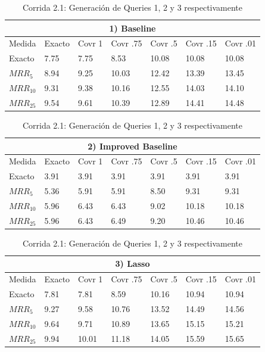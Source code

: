 \begin{table}
\centering
\begin{center}
\begin{tabular}{|l | l | l | l | l | l | l |}
\hline
\multicolumn{7}{|c|}{1) Baseline}  \\ \hline
Medida & Exacto & Covr 1 & Covr .75 & Covr .5 & Covr .15 & Covr .01 \\ \hline

Exacto & 7.75 & 7.75 & 8.53 & 10.08 & 10.08 & 10.08  \\ \hline
$MRR_{5}$ & 8.94 & 9.25 & 10.03 & 12.42 & 13.39 & 13.45  \\ \hline
$MRR_{10}$ & 9.31 & 9.38 & 10.16 & 12.55 & 14.03 & 14.10  \\ \hline
$MRR_{25}$ & 9.54 & 9.61 & 10.39 & 12.89 & 14.41 & 14.48  \\ \hline
\end{tabular}

\medskip

\begin{tabular}{|l | l | l | l | l | l | l |}
\hline
\multicolumn{7}{|c|}{2) Improved Baseline}  \\ \hline
Medida & Exacto & Covr 1 & Covr .75 & Covr .5 & Covr .15 & Covr .01 \\ \hline

Exacto & 3.91 & 3.91 & 3.91 & 3.91 & 3.91 & 3.91  \\ \hline
$MRR_{5}$ & 5.36 & 5.91 & 5.91 & 8.50 & 9.31 & 9.31  \\ \hline
$MRR_{10}$ & 5.96 & 6.43 & 6.43 & 9.02 & 10.18 & 10.18  \\ \hline
$MRR_{25}$ & 5.96 & 6.43 & 6.49 & 9.20 & 10.46 & 10.46  \\ \hline
\end{tabular}


\medskip

\begin{tabular}{|l | l | l | l | l | l | l |}
\hline
\multicolumn{7}{|c|}{3) Lasso}  \\ \hline
Medida & Exacto & Covr 1 & Covr .75 & Covr .5 & Covr .15 & Covr .01 \\ \hline

Exacto & 7.81 & 7.81 & 8.59 & 10.16 & 10.94 & 10.94  \\ \hline
$MRR_{5}$ & 9.27 & 9.58 & 10.76 & 13.52 & 14.49 & 14.56  \\ \hline
$MRR_{10}$ & 9.64 & 9.71 & 10.89 & 13.65 & 15.15 & 15.21  \\ \hline
$MRR_{25}$ & 9.94 & 10.01 & 11.18 & 14.05 & 15.59 & 15.65  \\ \hline
\end{tabular}

\caption{Corrida 2.1: Generación de Queries 1, 2 y 3 respectivamente}
\label{table:2_1_50_40_getExactMRRWikiFactoid_getCovrMRRWikiFactoidx}
\end{center}
\end{table}

